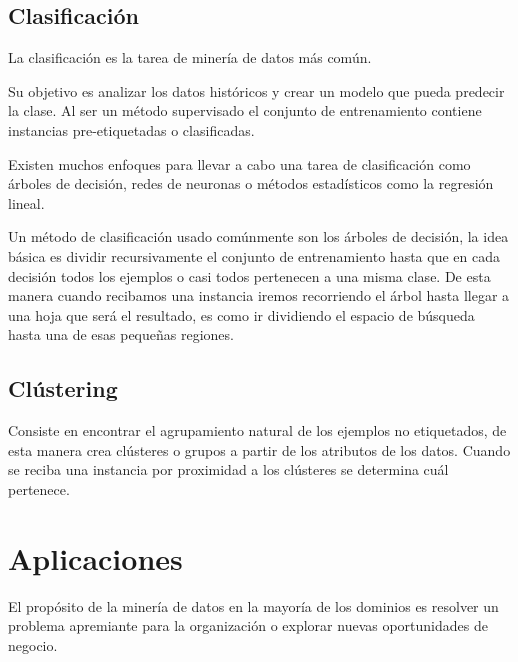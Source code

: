 \documentclass[12pt, twoside, openright]{report} %
\begin{document}
\subsection{Clasificación}
La clasificación es la tarea de minería de datos más común.

Su objetivo es analizar los datos históricos y crear un modelo que pueda predecir la clase. Al ser un método supervisado el conjunto de entrenamiento contiene instancias pre-etiquetadas o clasificadas.

Existen muchos enfoques para llevar a cabo una tarea de clasificación como árboles de decisión, redes de neuronas o métodos estadísticos como la regresión lineal.

Un método de clasificación usado comúnmente son los árboles de decisión, la idea básica es dividir recursivamente el conjunto de entrenamiento hasta que en cada decisión todos los ejemplos o casi todos pertenecen a una misma clase. De esta manera cuando recibamos una instancia iremos recorriendo el árbol hasta llegar a una hoja que será el resultado, es como ir dividiendo  el espacio de búsqueda hasta una de esas pequeñas regiones.

\subsection{Clústering}
Consiste en encontrar el agrupamiento natural de los ejemplos no etiquetados, de esta manera crea clústeres o grupos a partir de los atributos de los datos. Cuando se reciba una instancia por proximidad a los clústeres se determina cuál pertenece.

\section{Aplicaciones}
El propósito de la minería de datos en la mayoría de los dominios es resolver un problema apremiante para la organización o explorar nuevas oportunidades de negocio.
\end{document}
